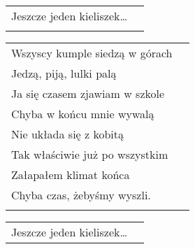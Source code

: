 \documentclass[a5paper]{article}
\begin{document}
\noindent
\begin{tabular}{@{}p{7.00cm}p{3cm}@{}}
Jeszcze jeden kieliszek… \\ \\
\end{tabular}

\noindent
\begin{tabular}{@{}p{7.00cm}p{3cm}@{}}
Wszyscy kumple siedzą w górach \\
Jedzą, piją, lulki palą\\
Ja się czasem zjawiam w szkole\\
Chyba w końcu mnie wywalą\\
Nie układa się z kobitą\\
Tak właściwie już po wszystkim\\
Załapałem klimat końca\\
Chyba czas, żebyśmy wyszli.\\ \\
\end{tabular}

\noindent
\begin{tabular}{@{}p{7.00cm}p{3cm}@{}}
Jeszcze jeden kieliszek…
\end{tabular}
\end{document}
